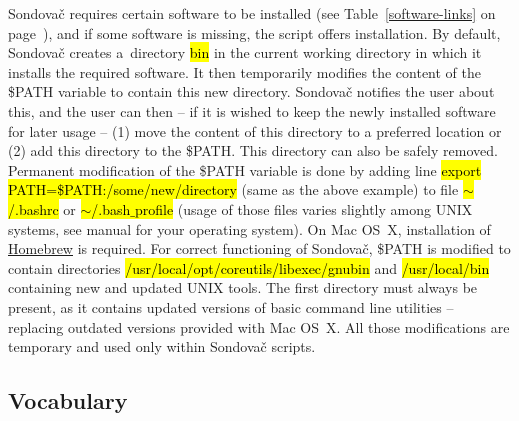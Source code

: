 \documentclass[a4paper, 11pt, twoside]{article}
\renewcommand{\texttt}[1]{\hl{\ttfamily #1}}
\begin{document}
Sondovač requires certain software to be installed (see Table~\ref{software-links} on page~\pageref{software-links}), and if some software is missing, the script offers installation. By default, Sondovač creates a~directory \texttt{bin} in the current working directory in which it installs the required software. It then temporarily modifies the content of the \$PATH variable to contain this new directory. Sondovač notifies the user about this, and the user can then -- if it is wished to keep the newly installed software for later usage -- (1) move the content of this directory to a preferred location or (2) add this directory to the \$PATH. This directory can also be safely removed. Permanent modification of the \$PATH variable is done by adding line \texttt{export PATH=\$PATH:/some/new/directory} (same as the above example) to file \texttt{$\sim$/.bashrc} or \texttt{$\sim$/.bash$\_$profile} (usage of those files varies slightly among UNIX systems, see manual for your operating system). On Mac OS~X, installation of \href{https://brew.sh/}{Homebrew} is required. For correct functioning of Sondovač, \$PATH is modified to contain directories \texttt{/usr/local/opt/coreutils/libexec/gnubin} and \texttt{/usr/local/bin} containing new and updated UNIX tools. The first directory must always be present, as it contains updated versions of basic command line utilities -- replacing outdated versions provided with Mac OS~X. All those modifications are temporary and used only within Sondovač scripts.

\subsection{Vocabulary}
\label{vocabulary}
\end{document}
